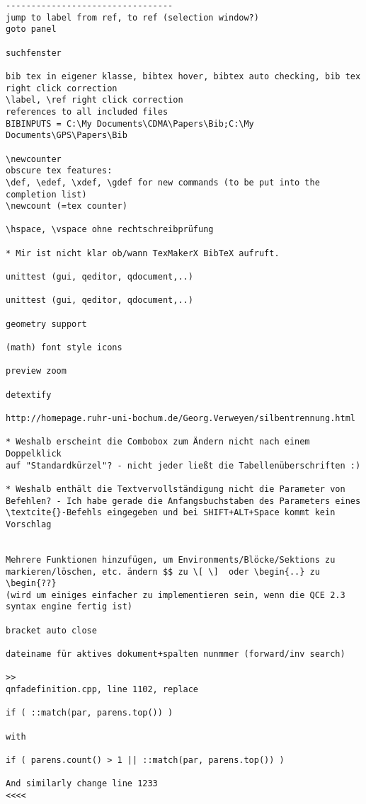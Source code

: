 \documentclass[10pt,a4paper,landscape]{report}
\begin{document}
\begin{verbatim}
---------------------------------
jump to label from ref, to ref (selection window?)
goto panel

suchfenster

bib tex in eigener klasse, bibtex hover, bibtex auto checking, bib tex right click correction
\label, \ref right click correction
references to all included files
BIBINPUTS = C:\My Documents\CDMA\Papers\Bib;C:\My Documents\GPS\Papers\Bib

\newcounter
obscure tex features:
\def, \edef, \xdef, \gdef for new commands (to be put into the completion list)
\newcount (=tex counter)

\hspace, \vspace ohne rechtschreibprüfung

* Mir ist nicht klar ob/wann TexMakerX BibTeX aufruft. 

unittest (gui, qeditor, qdocument,..)

unittest (gui, qeditor, qdocument,..)

geometry support

(math) font style icons

preview zoom

detextify

http://homepage.ruhr-uni-bochum.de/Georg.Verweyen/silbentrennung.html

* Weshalb erscheint die Combobox zum Ändern nicht nach einem Doppelklick
auf "Standardkürzel"? - nicht jeder ließt die Tabellenüberschriften :)

* Weshalb enthält die Textvervollständigung nicht die Parameter von
Befehlen? - Ich habe gerade die Anfangsbuchstaben des Parameters eines
\textcite{}-Befehls eingegeben und bei SHIFT+ALT+Space kommt kein Vorschlag


Mehrere Funktionen hinzufügen, um Environments/Blöcke/Sektions zu markieren/löschen, etc. ändern $$ zu \[ \]  oder \begin{..} zu \begin{??} 
(wird um einiges einfacher zu implementieren sein, wenn die QCE 2.3 syntax engine fertig ist)

bracket auto close

dateiname für aktives dokument+spalten nunmmer (forward/inv search)

>>
qnfadefinition.cpp, line 1102, replace

if ( ::match(par, parens.top()) )

with

if ( parens.count() > 1 || ::match(par, parens.top()) )

And similarly change line 1233
<<<<


\end{verbatim}
\end{document}
